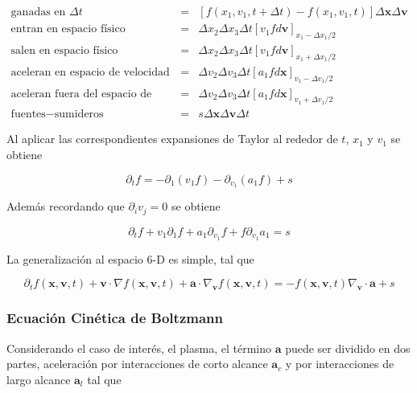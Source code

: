 \begin{eqnarray}
  \text{ganadas en } \Delta t &=& [f(x_1, v_{1}, t + \Delta t) - f(x_1, v_{1}, t)]\Delta\textbf{x}\Delta\textbf{v}\nonumber\\
  \text{entran en espacio f\'isico} &=& \Delta x_{2}\Delta x_{3}\Delta t[v_{1}fd\textbf{v}]_{x_1 - \Delta x_1/2} \nonumber\\
  \text{salen en espacio f\'isico} &=& \Delta x_{2}\Delta x_{3}\Delta t[v_{1}fd\textbf{v}]_{x_1 + \Delta x_1/2} \nonumber\\
  \text{aceleran en espacio de velocidad} &=& \Delta v_{2}\Delta v_{3}\Delta t[a_{1}fd\textbf{x}]_{v_{1} - \Delta v_{1}/2} \nonumber\\
  \text{aceleran fuera del espacio de velocidad} &=& \Delta v_{2}\Delta v_{3}\Delta t[a_{1}fd\textbf{x}]_{v_{1} + \Delta v_{1}/2} \nonumber\\
  \text{fuentes} - \text{sumideros} &=& s\Delta \textbf{x} \Delta\textbf{v}\Delta t \nonumber
\end{eqnarray}

Al aplicar las correspondientes expansiones de Taylor al rededor de $t$, $x_1$ y $v_1$ se obtiene 

\begin{equation*}
  \partial_t f = -\partial_{1}(v_1 f) - \partial_{v_1} (a_1 f) + s
\end{equation*}

Adem\'as recordando que $\partial_{i}v_j = 0$ se obtiene

\begin{equation*}
  \partial_t f + v_1\partial_{1}f + a_1\partial_{v_1} f + f\partial_{v_1}a_1 = s
\end{equation*}
  
La generalizaci\'on al espacio 6-D es simple, tal que 

\begin{equation*}
  \partial_t f(\textbf{x},\textbf{v}, t) + \textbf{v}\cdot\nabla f(\textbf{x}, \textbf{v}, t) + \textbf{a}\cdot\nabla_{\textbf{v}} f(\textbf{x}, \textbf{v}, t)= -f(\textbf{x}, \textbf{v}, t)\nabla_\textbf{v}\cdot \textbf{a} + s 
\end{equation*}

\subsubsection{Ecuaci\'on Cin\'etica de Boltzmann}

Considerando el caso de inter\'es, el plasma, el t\'ermino $\textbf{a}$ puede ser dividido en dos partes, aceleraci\'on por interacciones de corto alcance $\textbf{a}_c$ y por interacciones de largo alcance $\textbf{a}_l$ tal que 

